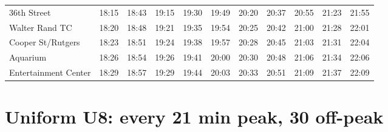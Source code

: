 \begin{center}
\begin{tabular}{@{}lrrrrrrrrrr@{}}
36th Street & 18:15 & 18:43 & 19:15 & 19:30 & 19:49 & 20:20 & 20:37 & 20:55 & 21:23 & 21:55 \\
Walter Rand TC & 18:20 & 18:48 & 19:21 & 19:35 & 19:54 & 20:25 & 20:42 & 21:00 & 21:28 & 22:01 \\
Cooper St/Rutgers & 18:23 & 18:51 & 19:24 & 19:38 & 19:57 & 20:28 & 20:45 & 21:03 & 21:31 & 22:04 \\
Aquarium & 18:26 & 18:54 & 19:26 & 19:41 & 20:00 & 20:30 & 20:48 & 21:06 & 21:34 & 22:06 \\
Entertainment Center & 18:29 & 18:57 & 19:29 & 19:44 & 20:03 & 20:33 & 20:51 & 21:09 & 21:37 & 22:09 \\
\bottomrule\end{tabular}\end{center}
\clearpage
\section{Uniform U8: every 21 min peak, 30 off-peak}\label{tt:uniform_U8}
